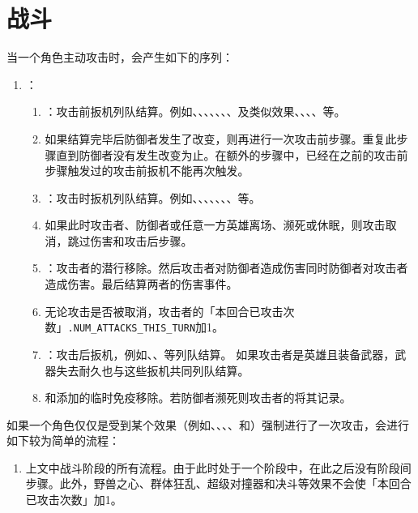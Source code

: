 \section{战斗}
\label{battle}

当一个角色主动攻击时，会产生如下的序列：
\begin{enumerate}
    \item {}：
    \begin{enumerate}
        \item {}：攻击前扳机列队结算。例如、、、、、、、及类似效果、、、、等。
        \item 如果结算完毕后防御者发生了改变，则再进行一次攻击前步骤。重复此步骤直到防御者没有发生改变为止。在额外的步骤中，已经在之前的攻击前步骤触发过的攻击前扳机不能再次触发。
        \item {}：攻击时扳机列队结算。例如、、、、、、、等。
        \item 如果此时攻击者、防御者或任意一方英雄离场、濒死或休眠，则攻击取消，跳过伤害和攻击后步骤。
        \item {}：攻击者的潜行移除。然后攻击者对防御者造成伤害同时防御者对攻击者造成伤害。最后结算两者的伤害事件。
        \item 无论攻击是否被取消，攻击者的「本回合已攻击次数」\texttt{.NUM\_ATTACKS\_THIS\_\allowbreak{}TURN}加1。
        \item {}：攻击后扳机，例如、、等列队结算。
            \notice 如果攻击者是英雄且装备武器，武器失去耐久也与这些扳机共同列队结算。
        \item {}和添加的临时免疫移除。若防御者濒死则攻击者的将其记录。
    \end{enumerate}
\end{enumerate}

如果一个角色仅仅是受到某个效果（例如、、、、和）强制进行了一次攻击，会进行如下较为简单的流程：
\begin{enumerate}
    \item  上文中战斗阶段的所有流程。由于此时处于一个阶段中，在此之后没有阶段间步骤。此外，野兽之心、群体狂乱、超级对撞器和决斗等效果不会使「本回合已攻击次数」加1。
\end{enumerate}

